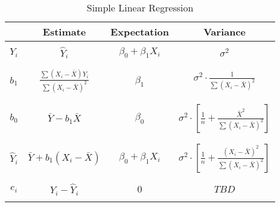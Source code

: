 \documentclass{article}
\begin{document}
\begin{table}[h]
\centering
\begin{tabular}{c || c c c }
\hline
& {Estimate} & {Expectation} & {Variance} \\
\hline
\\
$Y_i$& $\hat Y_i$ & $\beta_0+\beta_1 X_i$ & $\sigma^2$\\
\\
\hline
\\
$b_1$& $\frac{\sum (X_i-\bar X) Y_i}{\sum (X_i-\bar X)^2}$ & $\beta_1$ & $\sigma^2 \cdot \frac{1}{\sum (X_i-\bar X)^2}$\\
\\
\hline
\\
$b_0$& $\bar Y - b_1 \bar X$ & $\beta_0$ & $\sigma^2 \cdot \left[\frac{1}{n} + \frac{{\bar X}^2}{\sum (X_i-\bar X)^2}\right]$\\
\\
\hline
\\
$\hat Y_i$& $\bar Y + b_1 (X_i-\bar X)$ & $\beta_0+\beta_1 X_i$ & $\sigma^2 \cdot \left[\frac{1}{n} + \frac{(X_i-\bar X)^2}{\sum (X_i-\bar X)^2}\right]$\\
\\
\hline
\\
$e_i$& $Y_i-\hat Y_i$ & $0$ & $TBD$\\
\\
\hline
\end{tabular}
\caption{Simple Linear Regression}
\end{table}
\end{document}
